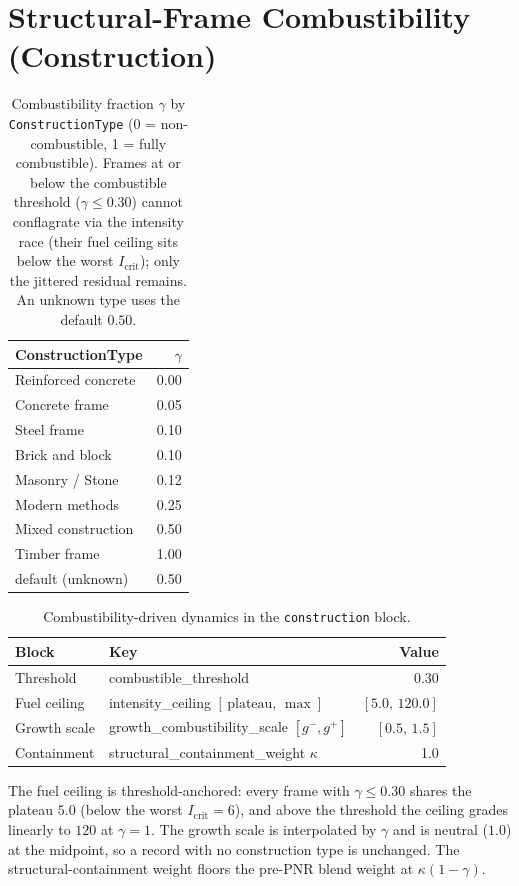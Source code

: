 \documentclass[11pt,a4paper]{article}
\begin{document}
\section{Structural-Frame Combustibility (Construction)}
\label{app:construction}

\begin{table}[H]
\centering
\caption{Combustibility fraction $\gamma$ by \texttt{ConstructionType}
(0 = non-combustible, 1 = fully combustible). Frames at or below the combustible
threshold ($\gamma \le 0.30$) cannot conflagrate via the intensity race (their
fuel ceiling sits below the worst $I_{\text{crit}}$); only the jittered residual
remains. An unknown type uses the default $0.50$.}
\begin{tabular}{lr}
\toprule
ConstructionType & $\gamma$ \\
\midrule
Reinforced concrete & 0.00 \\
Concrete frame      & 0.05 \\
Steel frame         & 0.10 \\
Brick and block     & 0.10 \\
Masonry / Stone     & 0.12 \\
Modern methods      & 0.25 \\
Mixed construction  & 0.50 \\
Timber frame        & 1.00 \\
\midrule
default (unknown)   & 0.50 \\
\bottomrule
\end{tabular}
\end{table}

\begin{table}[H]
\centering
\caption{Combustibility-driven dynamics in the \texttt{construction} block.}
\begin{tabular}{llr}
\toprule
Block & Key & Value \\
\midrule
Threshold      & combustible\_threshold & 0.30 \\
Fuel ceiling   & intensity\_ceiling $[\,\text{plateau},\,\max]$ & $[5.0,\,120.0]$ \\
Growth scale   & growth\_combustibility\_scale $[g^-,g^+]$ & $[0.5,\,1.5]$ \\
Containment    & structural\_containment\_weight $\kappa$ & 1.0 \\
\bottomrule
\end{tabular}
\end{table}

\noindent The fuel ceiling is threshold-anchored: every frame with
$\gamma\le0.30$ shares the plateau $5.0$ (below the worst $I_{\text{crit}}=6$),
and above the threshold the ceiling grades linearly to $120$ at $\gamma=1$. The
growth scale is interpolated by $\gamma$ and is neutral ($1.0$) at the midpoint,
so a record with no construction type is unchanged. The structural-containment
weight floors the pre-PNR blend weight at $\kappa(1-\gamma)$.
\end{document}
